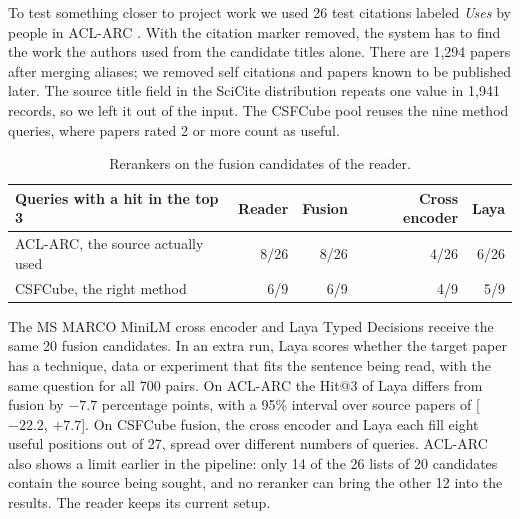 \documentclass[11pt,a4paper]{article}
\begin{document}
To test something closer to project work we used 26 test citations labeled \textit{Uses} by people in ACL-ARC \citep{jurgens2018aclarc}. With the citation marker removed, the system has to find the work the authors used from the candidate titles alone. There are 1,294 papers after merging aliases; we removed self citations and papers known to be published later. The source title field in the SciCite distribution repeats one value in 1,941 records, so we left it out of the input. The CSFCube pool reuses the nine method queries, where papers rated 2 or more count as useful.
\begin{table}[htbp]\centering\small
\begin{tabular}{@{}lrrrr@{}}\toprule
Queries with a hit in the top 3 & Reader & Fusion & Cross encoder & Laya\\\midrule
ACL-ARC, the source actually used & 8/26 & 8/26 & 4/26 & 6/26\\
CSFCube, the right method & 6/9 & 6/9 & 4/9 & 5/9\\\bottomrule
\end{tabular}\caption{Rerankers on the fusion candidates of the reader.}\label{tab:rerankers}\end{table}
The MS MARCO MiniLM cross encoder and Laya Typed Decisions receive the same 20 fusion candidates. In an extra run, Laya scores whether the target paper has a technique, data or experiment that fits the sentence being read, with the same question for all 700 pairs. On ACL-ARC the Hit@3 of Laya differs from fusion by $-7.7$ percentage points, with a 95\% interval over source papers of [$-22.2$, $+7.7$]. On CSFCube fusion, the cross encoder and Laya each fill eight useful positions out of 27, spread over different numbers of queries. ACL-ARC also shows a limit earlier in the pipeline: only 14 of the 26 lists of 20 candidates contain the source being sought, and no reranker can bring the other 12 into the results. The reader keeps its current setup.
\end{document}
